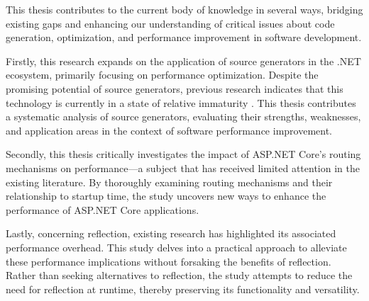 This thesis contributes to the current body of knowledge in several ways, bridging existing gaps and enhancing our understanding of critical issues about code generation, optimization, and performance improvement in software development.

Firstly, this research expands on the application of source generators in the .NET ecosystem, primarily focusing on performance optimization. Despite the promising potential of source generators, previous research indicates that this technology is currently in a state of relative immaturity \cite{Slimak2022}. This thesis contributes a systematic analysis of source generators, evaluating their strengths, weaknesses, and application areas in the context of software performance improvement.

Secondly, this thesis critically investigates the impact of ASP.NET Core's routing mechanisms on performance—a subject that has received limited attention in the existing literature. By thoroughly examining routing mechanisms and their relationship to startup time, the study uncovers new ways to enhance the performance of ASP.NET Core applications.

Lastly, concerning reflection, existing research has highlighted its associated performance overhead. This study delves into a practical approach to alleviate these performance implications without forsaking the benefits of reflection. Rather than seeking alternatives to reflection, the study attempts to reduce the need for reflection at runtime, thereby preserving its functionality and versatility.